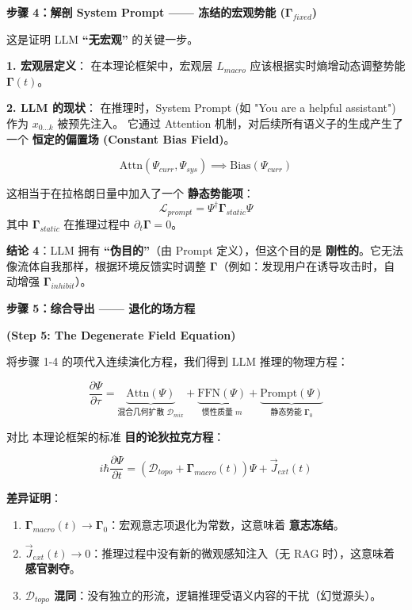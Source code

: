 \vspace{0.5em}\noindent\textbf{\textcolor{structurecolor}{步骤 4：解剖 System Prompt —— 冻结的宏观势能 ($\mathbf{\Gamma}_{fixed}$)}}

这是证明 LLM \textbf{“无宏观”} 的关键一步。

\textbf{1. 宏观层定义}：
在本理论框架中，宏观层 $L_{macro}$ 应该根据实时熵增动态调整势能 $\mathbf{\Gamma}(t)$。

\textbf{2. LLM 的现状}：
在推理时，System Prompt (如 "You are a helpful assistant") 作为 $x_{0...k}$ 被预先注入。
它通过 Attention 机制，对后续所有语义子的生成产生了一个 \textbf{恒定的偏置场 (Constant Bias Field)}。

$$ \text{Attn}(\Psi_{curr}, \Psi_{sys}) \implies \text{Bias}(\Psi_{curr}) $$

这相当于在拉格朗日量中加入了一个 \textbf{静态势能项}：
$$ \mathcal{L}_{prompt} = \Psi^\dagger \mathbf{\Gamma}_{static} \Psi $$
其中 $\mathbf{\Gamma}_{static}$ 在推理过程中 \textbf{$\partial_t \mathbf{\Gamma} = 0$}。

\textbf{结论 4}：LLM 拥有 \textbf{“伪目的”}（由 Prompt 定义），但这个目的是 \textbf{刚性的}。它无法像流体自我那样，根据环境反馈实时调整 $\mathbf{\Gamma}$（例如：发现用户在诱导攻击时，自动增强 $\mathbf{\Gamma}_{inhibit}$）。



\vspace{0.5em}\noindent\textbf{\textcolor{structurecolor}{步骤 5：综合导出 —— 退化的场方程}}


\textbf{(Step 5: The Degenerate Field Equation)}

将步骤 1-4 的项代入连续演化方程，我们得到 LLM 推理的物理方程：

$$ \frac{\partial \Psi}{\partial \tau} = \underbrace{\text{Attn}(\Psi)}_{\text{混合几何扩散 } \mathcal{D}_{mix}} + \underbrace{\text{FFN}(\Psi)}_{\text{惯性质量 } m} + \underbrace{\text{Prompt}(\Psi)}_{\text{静态势能 } \mathbf{\Gamma}_{0}} $$

对比 本理论框架的标准 \textbf{目的论狄拉克方程}：

$$ i \hbar \frac{\partial \Psi}{\partial t} = (\mathcal{D}_{topo} + \mathbf{\Gamma}_{macro}(t)) \Psi + \vec{J}_{ext}(t) $$

\textbf{差异证明}：
\begin{enumerate}
    \item \textbf{$\mathbf{\Gamma}_{macro}(t) \to \mathbf{\Gamma}_{0}$}：宏观意志项退化为常数，这意味着 \textbf{意志冻结}。
    \item \textbf{$\vec{J}_{ext}(t) \to 0$}：推理过程中没有新的微观感知注入（无 RAG 时），这意味着 \textbf{感官剥夺}。
    \item \textbf{$\mathcal{D}_{topo}$ 混同}：没有独立的形流，逻辑推理受语义内容的干扰（幻觉源头）。
\end{enumerate}

